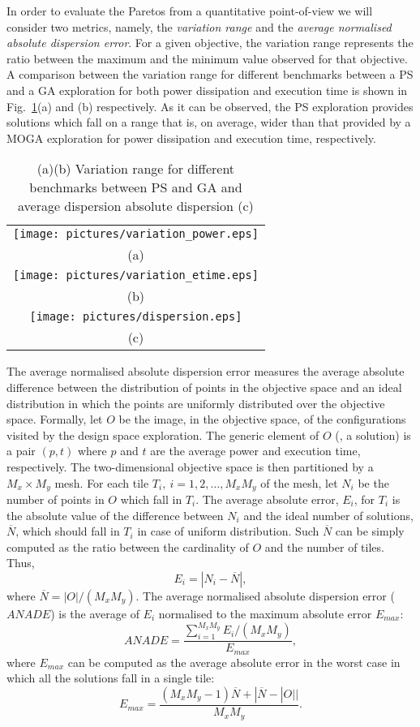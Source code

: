 In order to evaluate the Paretos from a quantitative point-of-view we
will consider two metrics, namely, the \emph{variation range} and the
\emph{average normalised absolute dispersion error}. For a given
objective, the variation range represents the ratio between the
maximum and the minimum value observed for that objective. A
comparison between the variation range for different benchmarks
between a PS and a GA exploration for both power dissipation and
execution time is shown in Fig.~\ref{fig:dispersion}(a) and (b)
respectively. As it can be observed, the PS exploration provides solutions which fall on a
range that is, on average, wider than that provided by a
MOGA exploration for power dissipation and execution time, respectively.
\begin{table}
  \centering
  \begin{tabular}{c}
    \texttt{[image: pictures/variation\_power.eps]} \\
    (a) \\
    \texttt{[image: pictures/variation\_etime.eps]} \\
    (b) \\
    \texttt{[image: pictures/dispersion.eps]} \\
    (c) 
  \end{tabular}
  \caption{(a)(b) Variation range for different benchmarks between PS and GA
  and average dispersion absolute dispersion (c)}
  \label{fig:dispersion}
\end{table}

The average normalised absolute dispersion error measures
the average absolute difference between the distribution of points in
the objective space and an ideal distribution in which the points are
uniformly distributed over the objective space. Formally, let $O$ be
the image, in the objective space, of the configurations visited by
the design space exploration. The generic element of $O$ (\ie, a
solution) is a pair $(p,t)$ where $p$ and $t$ are the average power
and execution time, respectively. The two-dimensional objective space
is then partitioned by a $M_x \times M_y$ mesh. For each tile $T_i,
\ i=1, 2, \ldots, M_xM_y$ of the mesh, let $N_i$ be the number
of points in $O$ which fall in $T_i$. The average absolute error, $E_i$, for
$T_i$ is the absolute value of the difference between $N_i$ and the
ideal number of solutions, $\overline{N}$, which should fall in $T_i$
in case of uniform distribution. Such $\overline{N}$ can be simply
computed as the ratio between the cardinality of $O$ and the number of
tiles. Thus,
\[ E_i = |N_i - \overline{N}|, \]
where $\overline{N} = |O| / (M_x M_y)$. The average
normalised absolute dispersion error ($ANADE$) is the average of $E_i$
normalised to the maximum absolute error $E_{max}$:
\[ ANADE = \frac{\sum_{i=1}^{M_xM_y} E_i/(M_xM_y)}{E_{max}}, \]
where $E_{max}$ can be computed as the average absolute error in the worst
case in which all the solutions fall in a single tile:
\[ E_{max} = \frac{(M_x M_y - 1) \overline{N} + |\overline{N} -
    |O|| }{M_x M_y}. \] 

